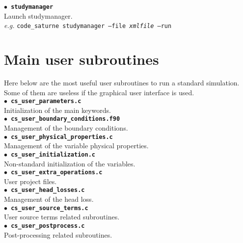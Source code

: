 \documentclass[a4paper,11pt]{article}
\newcommand{\refword}[1]{\texttt{$\bullet$ \bf{#1}}}
\begin{document}
\begin{multicols*}{3}
\refword{studymanager}\\
Launch studymanager.\\
\textit{e.g.} \texttt{code\_saturne studymanager --file \emph{xmlfile} --run}\\



\section*{Main user subroutines}

Here below are the most useful user subroutines to run a standard
simulation. Some of them are useless if the graphical user interface
is used.\\

\refword{cs\_user\_parameters.c}\\
Initialization of the main keywords.\\

\refword{cs\_user\_boundary\_conditions.f90}\\
Management of the boundary conditions.\\

\refword{cs\_user\_physical\_properties.c}\\
Management of the variable physical properties.\\

\refword{cs\_user\_initialization.c}\\
Non-standard initialization of the variables.\\

\refword{cs\_user\_extra\_operations.c}\\
User project files.\\

\refword{cs\_user\_head\_losses.c}\\
Management of the head loss.\\

\refword{cs\_user\_source\_terms.c}\\
User source terms related subroutines.\\

\refword{cs\_user\_postprocess.c}\\
Post-processing related subroutines.\\




\end{multicols*}
\end{document}
